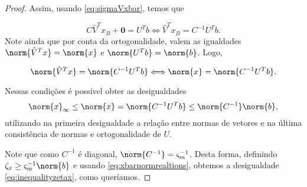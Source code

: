 \begin{proof}
Assim, usando \eqref{eq:sigmaVxbar},
temos que

\[
C\hat{V}^Tx_B + \bm{0}  = U^Tb \Longleftrightarrow \hat{V}^Tx_B =  C^{-1} U^Tb.
\]
Note ainda que por conta da ortogonalidade, valem as  igualdades
$\norm{\hat{V}^Tx } = \norm{x }$ e $\norm{ U^Tb} = \norm{b}$. Logo,

\[
\norm{\hat{V}^Tx } = \norm{C^{-1} U^Tb}  \Longleftrightarrow \norm{x } =
\norm{C^{-1}U^Tb}.
\]

Nessas condições é possível obter as  desigualdades
\begin{equation}
\label{eq:xbarnormrealtions}
\norm{x }_\infty \leq \norm{x } = \norm{C^{-1}U^Tb} \leq
\norm{C^{-1}}\norm{b},
\end{equation}
utilizando na primeira desigualdade a relação entre normas de vetores e na
última consistência de normas e ortogonalidade de $U$.

Note que como $C^{-1}$ é diagonal,  $\norm{C^{-1}} =
\varsigma_m^{-1}$. Desta forma, definindo $\zeta_x \geq
\varsigma_m^{-1}\norm{b}$ e usando \eqref{eq:xbarnormrealtions}, obtemos a desigualdade
\eqref{eq:inequalityzetax}, como queríamos.

\end{proof}
% 
% 
%  
%  
%  
% 
% 
% 
